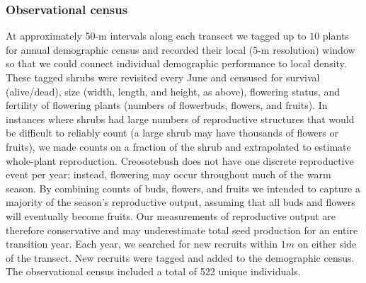\documentclass[11pt]{article}\usepackage[]{graphicx}\usepackage[]{color}
\begin{document}
\subsubsection*{Observational census}
At approximately 50-m intervals along each transect we tagged up to $10$ plants for annual demographic census and recorded their local (5-m resolution) window so that we could connect individual demographic performance to local density. 
These tagged shrubs were revisited every June and censused for survival (alive/dead), size (width, length, and height, as above), flowering status, and fertility of flowering plants (numbers of flowerbuds, flowers, and fruits). 
In instances where shrubs had large numbers of reproductive structures that would be difficult to reliably count (a large shrub may have thousands of flowers or fruits), we made counts on a fraction of the shrub and extrapolated to estimate whole-plant reproduction. 
Creosotebush does not have one discrete reproductive event per year; instead, flowering may occur throughout much of the warm season. 
By combining counts of buds, flowers, and fruits we intended to capture a majority of the season's reproductive output, assuming that all buds and flowers will eventually become fruits. 
Our measurements of reproductive output are therefore conservative and may underestimate total seed production for an entire transition year. 
Each year, we searched for new recruits within $1m$ on either side of the transect.
New recruits were tagged and added to the demographic census. 
The observational census included a total of 522 unique individuals. 
\end{document}
